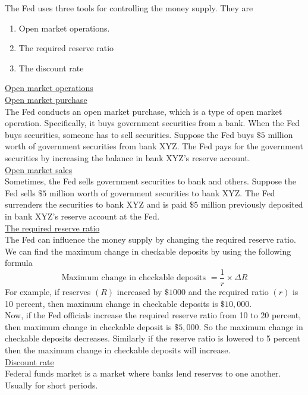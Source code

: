 \documentclass[12pt]{article}
\begin{document}
\begin{soln}
	The Fed uses three tools for controlling the money supply. They are
	\begin{enumerate}
		\item Open market operations.
		\item The required reserve ratio
		\item The discount rate
	\end{enumerate}
	\underline{Open market operations}\\
	\underline{Open market purchase}\\
	The Fed conducts an open market purchase, which is a type of open market operation. Specifically, it buys government securities from a bank. When the Fed buys securities, someone has to sell securities. Suppose the Fed buys $ \$5 $ million worth of government securities from bank XYZ. The Fed pays for the government securities by increasing the balance in bank XYZ's reserve account.\\

	\underline{Open market sales}\\
	\indent Sometimes, the Fed sells government securities to bank and others. Suppose the Fed sells $ \$5 $ million worth of government securities to bank XYZ. The Fed surrenders the securities to bank XYZ and is paid $ \$5 $ million previously deposited in bank XYZ's reserve account at the Fed.\\

	\underline{The required reserve ratio}\\
	\indent The Fed can influence the money supply by changing the required reserve ratio. We can find the maximum change in checkable deposits by using the following formula
	\[\text{Maximum change in checkable deposits }=\frac{1}{r}\times \Delta R\]
	For example, if reserves $ (R) $ increased by $ \$1000 $ and the required ratio $ (r) $ is 10 percent, then maximum change in checkable deposits is $ \$10,000 $.\\
	Now, if the Fed officials increase the required reserve ratio from 10 to 20 percent, then maximum change in checkable deposit is $ \$5,000 $. So the maximum change in checkable deposits decreases. Similarly if the reserve ratio is lowered to 5 percent then the maximum change in checkable deposits will increase.\\

	\underline{Discount rate}\\
	\indent Federal funds market is a market where banks lend reserves to one another. Usually for short periods.\\


\end{soln}
\end{document}
